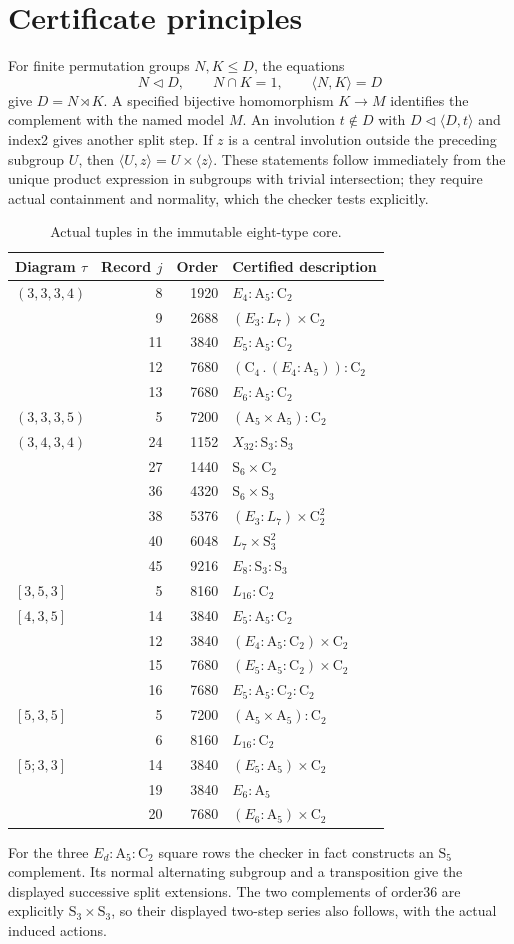 \documentclass[11pt]{article}
\newcommand{\C}{\mathrm C}\newcommand{\A}{\mathrm A}\newcommand{\Sym}{\mathrm S}\newcommand{\PSL}{\mathrm{PSL}}
\begin{document}
\section{Certificate principles}
For finite permutation groups $N,K\leq D$, the equations
\[
 N\triangleleft D,\qquad N\cap K=1,\qquad \langle N,K\rangle=D
\]
give $D=N\rtimes K$. A specified bijective homomorphism $K\to M$ identifies
the complement with the named model $M$. An involution $t\notin D$ with
$D\triangleleft\langle D,t\rangle$ and index2 gives another split step.
If $z$ is a central involution outside the preceding subgroup $U$, then
$\langle U,z\rangle=U\times\langle z\rangle$.
These statements follow immediately from the unique product expression in
subgroups with trivial intersection; they require actual containment and
normality, which the checker tests explicitly.
\newpage
\begin{table}[t]\centering\small
\begin{tabular}{@{}lrrl@{}}\toprule
Diagram $\tau$&Record $j$&Order&Certified description\\\midrule
$(3,3,3,4)$&8&1920&$E_4:\A_5:\C_2$\\
&9&2688&$(E_3:L_7)\times\C_2$\\
&11&3840&$E_5:\A_5:\C_2$\\
&12&7680&$(\C_4\mathbin{.}(E_4:\A_5)):\C_2$\\
&13&7680&$E_6:\A_5:\C_2$\\
$(3,3,3,5)$&5&7200&$(\A_5\times\A_5):\C_2$\\
$(3,4,3,4)$&24&1152&$X_{32}:\Sym_3:\Sym_3$\\
&27&1440&$\Sym_6\times\C_2$\\
&36&4320&$\Sym_6\times\Sym_3$\\
&38&5376&$(E_3:L_7)\times\C_2^2$\\
&40&6048&$L_7\times\Sym_3^2$\\
&45&9216&$E_8:\Sym_3:\Sym_3$\\
$[3,5,3]$&5&8160&$L_{16}:\C_2$\\
$[4,3,5]$&14&3840&$E_5:\A_5:\C_2$\\
&12&3840&$(E_4:\A_5:\C_2)\times\C_2$\\
&15&7680&$(E_5:\A_5:\C_2)\times\C_2$\\
&16&7680&$E_5:\A_5:\C_2:\C_2$\\
$[5,3,5]$&5&7200&$(\A_5\times\A_5):\C_2$\\
&6&8160&$L_{16}:\C_2$\\
$[5;3,3]$&14&3840&$(E_5:\A_5)\times\C_2$\\
&19&3840&$E_6:\A_5$\\
&20&7680&$(E_6:\A_5)\times\C_2$\\\bottomrule
\end{tabular}
\caption{Actual tuples in the immutable eight-type core.}\label{tab}
\end{table}
For the three $E_d:\A_5:\C_2$ square rows the checker in fact constructs
an $\Sym_5$ complement. Its normal alternating subgroup and a transposition
give the displayed successive split extensions. The two complements of
order36 are explicitly $\Sym_3\times\Sym_3$, so their displayed two-step
series also follows, with the actual induced actions.
\end{document}
